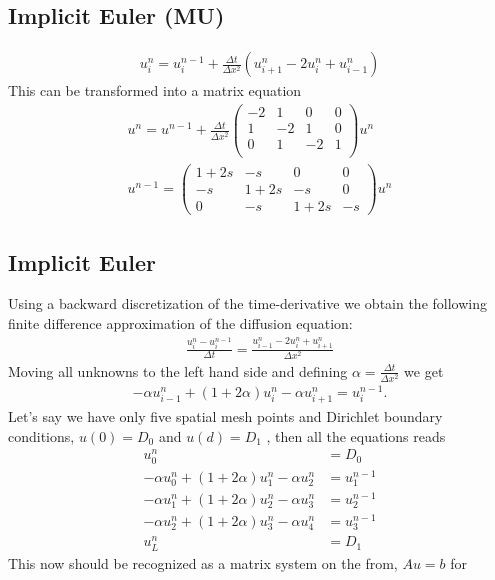 \documentclass[11pt,a4paper,draft]{article}
\numberwithin{equation}{section}
\begin{document}
\subsection{Implicit Euler (MU)}
\begin{gather}
u_i^n = u_i^{n-1} + \frac{\Delta t}{\Delta x^2}\left(
u_{i+1}^n - 2u_i^n + u_{i-1}^n
\right)
\end{gather}
This can be transformed into a matrix equation
\begin{gather}
u^n = u^{n-1} + \frac{\Delta t}{\Delta x^2}
\begin{pmatrix}
-2 & 1 & 0 & 0\\
1 & -2 & 1 & 0\\
0 & 1 & -2 & 1\\
\end{pmatrix}u^n\\
u^{n-1} =
\begin{pmatrix}
1 + 2s & -s & 0 & 0\\
-s & 1 + 2s & -s & 0\\
0 & -s & 1 + 2s & -s
\end{pmatrix}u^n
\end{gather}

\subsection{Implicit Euler}

Using a backward discretization of the time-derivative we obtain the following finite difference approximation of the diffusion equation:
\begin{align*}
\frac{u_{i}^{n}-u_{i}^{n-1}}{\Delta t} = \frac{u_{i-1}^{n}-2u_{i}^{n}+u_{i+1}^{n}}{\Delta x^2}
\end{align*}
Moving all unknowns to the left hand side and defining $\alpha = \frac{\Delta t}{\Delta x^2}$ we get
\begin{align*}
-\alpha u_{i-1}^n + (1+2\alpha)u_i^n - \alpha u_{i+1}^n = u_i^{n-1}. 
\end{align*}
Let's say we have only five spatial mesh points and Dirichlet boundary conditions, $u(0)=D_0$ and $u(d)=D_1$ , then all the equations reads
\begin{align*}
u_0^n &= D_0 \\
-\alpha u_{0}^n + (1+2\alpha)u_1^n - \alpha u_{2}^n &= u_1^{n-1} \\
-\alpha u_{1}^n + (1+2\alpha)u_2^n - \alpha u_{3}^n &= u_2^{n-1} \\
-\alpha u_{2}^n + (1+2\alpha)u_3^n - \alpha u_{4}^n &= u_3^{n-1} \\
u_L^n &= D_1 
\end{align*}
This now should be recognized as a matrix system on the from, $Au=b$ for 
\end{document}
